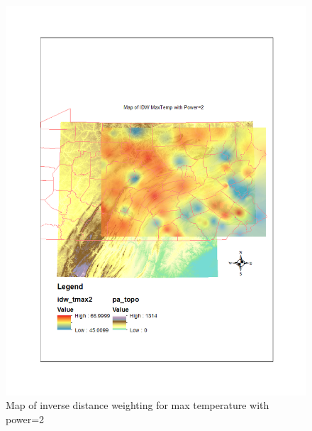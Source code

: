 \documentclass{article}\usepackage[]{graphicx}\usepackage[]{color}
\begin{document}
\begin{figure}
\includegraphics[scale=.9]{./figure/IDWmax2}
\caption{Map of inverse distance weighting for max temperature with power=2}
\label{idwmax2}
\end{figure}
\end{document}
